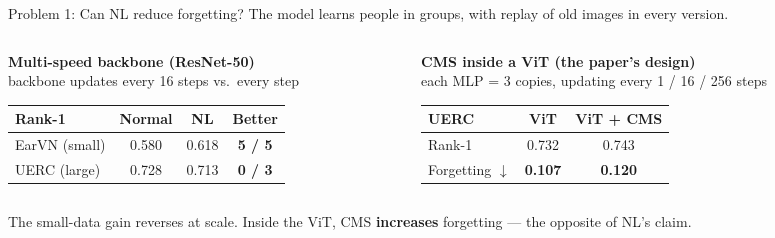 \documentclass[aspectratio=169,10pt]{beamer}
\newcommand{\up}[1]{\textcolor{good}{\textbf{#1}}}
\newcommand{\down}[1]{\textcolor{bad}{\textbf{#1}}}
\newcommand{\takeaway}[1]{\vfill\begin{center}\colorbox{accent!10}{\parbox{0.92\textwidth}{\centering\vspace{3pt}#1\vspace{3pt}}}\end{center}}
\begin{document}
\begin{frame}{Problem 1: Can NL reduce forgetting?}
\small The model learns people in groups, with replay of old images in every version.

\begin{columns}[T]
\begin{column}{0.50\textwidth}
\centering\textbf{Multi-speed backbone (ResNet-50)}\\[2pt]
{\scriptsize backbone updates every 16 steps vs.\ every step}\\[4pt]
\begin{tabular}{lccc}
\toprule
\textbf{Rank-1} & \textbf{Normal} & \textbf{NL} & \textbf{Better}\\
\midrule
EarVN (small) & 0.580 & 0.618 & \up{5 / 5}\\
UERC (large)  & 0.728 & 0.713 & \down{0 / 3}\\
\bottomrule
\end{tabular}
\end{column}
\begin{column}{0.48\textwidth}
\centering\textbf{CMS inside a ViT (the paper's design)}\\[2pt]
{\scriptsize each MLP = 3 copies, updating every 1 / 16 / 256 steps}\\[4pt]
\begin{tabular}{lcc}
\toprule
\textbf{UERC} & \textbf{ViT} & \textbf{ViT + CMS}\\
\midrule
Rank-1 & 0.732 & 0.743\\
Forgetting $\downarrow$ & \textbf{0.107} & \down{0.120}\\
\bottomrule
\end{tabular}
\end{column}
\end{columns}

\takeaway{The small-data gain reverses at scale. Inside the ViT, CMS \textbf{increases} forgetting --- the opposite of NL's claim.}
\end{frame}
\end{document}
